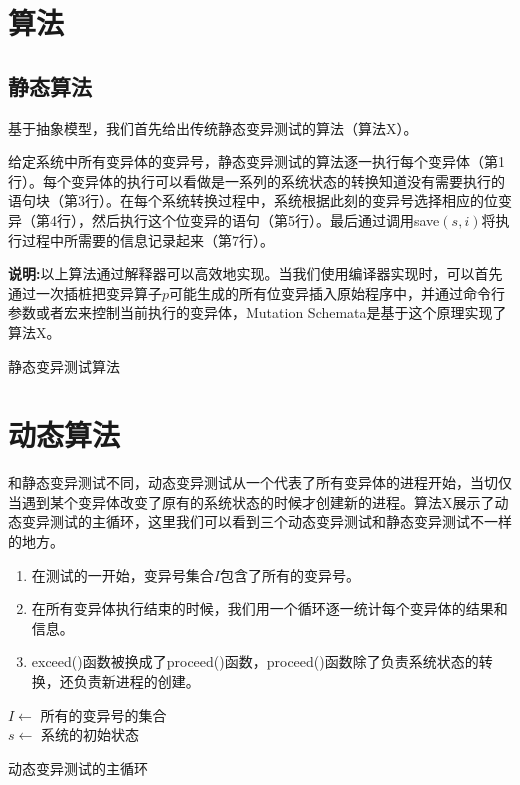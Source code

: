 \documentclass[nofonts]{ctexrep}
\begin{document}
\section{算法}
\subsection{静态算法}
基于抽象模型，我们首先给出传统静态变异测试的算法（算法X）。

给定系统中所有变异体的变异号，静态变异测试的算法逐一执行每个变异体（第1行）。每个变异体的执行可以看做是一系列的系统状态的转换知道没有需要执行的语句块（第3行）。在每个系统转换过程中，系统根据此刻的变异号选择相应的位变异（第4行），然后执行这个位变异的语句（第5行）。最后通过调用save$(s,i)$将执行过程中所需要的信息记录起来（第7行）。

\textbf{说明:}以上算法通过解释器可以高效地实现。当我们使用编译器实现时，可以首先通过一次插桩把变异算子$p$可能生成的所有位变异插入原始程序中，并通过命令行参数或者宏来控制当前执行的变异体，Mutation Schemata是基于这个原理实现了算法X。

\begin{algorithm}[t]
\caption{静态变异测试算法}
\label{alg:static}


\end{algorithm}

\section{动态算法}
和静态变异测试不同，动态变异测试从一个代表了所有变异体的进程开始，当切仅当遇到某个变异体改变了原有的系统状态的时候才创建新的进程。算法X展示了动态变异测试的主循环，这里我们可以看到三个动态变异测试和静态变异测试不一样的地方。
\begin{enumerate}
\item
在测试的一开始，变异号集合$I$包含了所有的变异号。
\item
在所有变异体执行结束的时候，我们用一个循环逐一统计每个变异体的结果和信息。
\item
exceed()函数被换成了proceed()函数，proceed()函数除了负责系统状态的转换，还负责新进程的创建。
\end{enumerate}

\begin{algorithm}[t]
  $I \leftarrow$ 所有的变异号的集合\\
  $s \leftarrow$ 系统的初始状态\\
\caption{动态变异测试的主循环}
\label{alg:main}
\end{algorithm}
\end{document}
